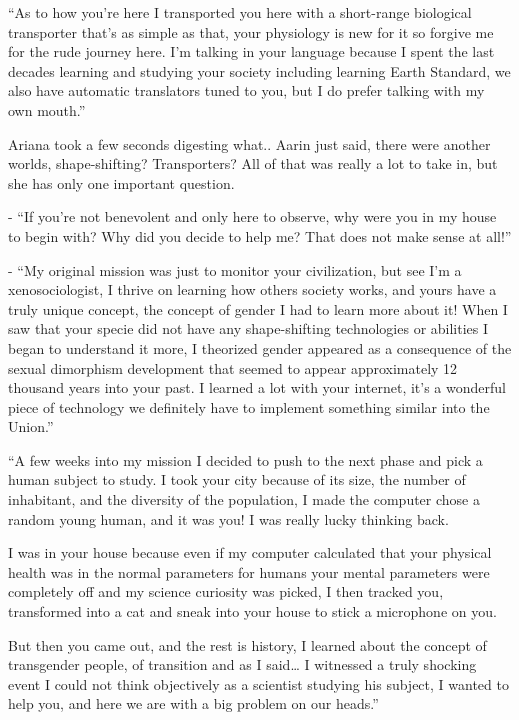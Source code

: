 \documentclass[colorlinks,12pt,a4paper]{book}
\begin{document}
“As to how you're here I transported you here with a short-range biological transporter that's as simple as that, 
your physiology is new for it so forgive me for the rude journey here. I'm talking in your language because I spent the
 last decades learning and studying your society including learning Earth Standard, we also have automatic translators 
 tuned to you, but I do prefer talking with my own mouth.”\par
 \bigskip

Ariana took a few seconds digesting what.. Aarin just said, there were another worlds, shape-shifting? Transporters? 
All of that was really a lot to take in, but she has only one important question.\par
\bigskip

- “If you're not benevolent and only here to observe, why were you in my house to begin with? 
Why did you decide to help me? That does not make sense at all!”\par
\bigskip

- “My original mission was just to monitor your civilization, but see I'm a xenosociologist, I thrive on learning 
how others society works, and yours have a truly unique concept, the concept of gender I had to learn more about it! 
When I saw that your specie did not have any shape-shifting technologies or abilities I began to
 understand it more, I theorized gender appeared as a consequence of the sexual dimorphism development 
 that seemed to appear approximately 12 thousand years into your past. I learned a lot with your internet, 
 it's a wonderful piece of technology we definitely have to implement something similar into the Union.”\par
 \bigskip

“A few weeks into my mission I decided to push to the next phase and pick a human subject to study. I took your city 
because of its size, the number of inhabitant, and the diversity of the population, I made the computer chose a 
random young human, and it was you! I was really lucky thinking back.\par
\bigskip

I was in your house because even if my computer calculated that your physical health was in the normal parameters 
for humans your mental parameters were completely off and my science curiosity was picked, I then tracked you,
 transformed into a cat and sneak into your house to stick a microphone on you. \par
 \bigskip

But then you came out, and the rest is history, I learned about the concept of transgender people, of 
transition and as I said… I witnessed a truly shocking event I could not think objectively as a scientist 
studying his subject, I wanted to help you, and here we are with a big problem on our heads.”\par
\bigskip
\end{document}
